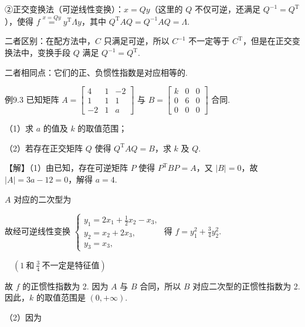 ②正交变换法（可逆线性变换）：$x=Qy$（这里的 $Q$ 不仅可逆，还满足 $Q^{-1}=Q^{\mathrm T}$），使得 $f\overset{x=Qy}{=}y^{\mathrm T}\Lambda y$，其中 $Q^{\mathrm T}AQ=Q^{-1}AQ=\Lambda$.

二者区别：在配方法中，$C$ 只满足可逆，所以 $C^{-1}$ 不一定等于 $C^{\mathrm T}$，但是在正交变换法中，变换手段 $Q$ 满足 $Q^{-1}=Q^{\mathrm T}$.

二者相同点：它们的正、负惯性指数是对应相等的.

\begin{fcard}{例9.3}
已知矩阵 $A=\begin{bmatrix}4&1&-2\\1&1&1\\-2&1&a\end{bmatrix}$ 与 $B=\begin{bmatrix}k&0&0\\0&6&0\\0&0&0\end{bmatrix}$ 合同.

（1）求 $a$ 的值及 $k$ 的取值范围；

（2）若存在正交矩阵 $Q$ 使得 $Q^{\mathrm T}AQ=B$，求 $k$ 及 $Q$.


【解】（1）由已知，存在可逆矩阵 $P$ 使得 $P^{\mathrm T}BP=A$，又 $|B|=0$，故 $|A|=3a-12=0$，解得 $a=4$.

$A$ 对应的二次型为




故经可逆线性变换 $\begin{cases}y_1=2x_1+\frac12x_2-x_3,\\[2pt]y_2=x_2+2x_3,\\[2pt]y_3=x_3,\end{cases}$ 得 $f=y_1^2+\frac34y_2^2$.

$\quad(1\ \text{和}\ \frac34\ \text{不一定是特征值})$

故 $f$ 的正惯性指数为 2. 因为 $A$ 与 $B$ 合同，所以 $B$ 对应二次型的正惯性指数为 2. 因此，$k$ 的取值范围是 $(0,+\infty)$.

（2）因为


\end{fcard}
